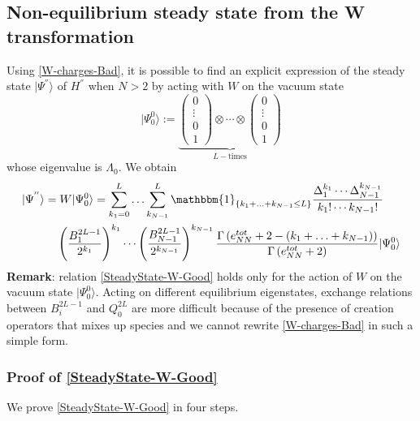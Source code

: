 \documentclass[10pt]{article}
\numberwithin{equation}{section}
\numberwithin{equation}{subsection}
\begin{document}
\subsection{Non-equilibrium steady state from the W transformation}\label{subsection-NONSS-W}
Using \eqref{W-charges-Bad}, it is possible to find an explicit expression of the steady state $|\Psi^{''}\rangle$ of $H^{''}$ when $N>2$ by acting with $W$ on the vacuum state 
\begin{equation}\label{Vacuum-state}
	|\Psi_{0}^{0}\rangle:=\underbrace{\begin{pmatrix}
			0\\
			\vdots\\
			0\\
			1
		\end{pmatrix}\otimes \cdots \otimes\begin{pmatrix}
			0\\
			\vdots\\
			0\\
			1
	\end{pmatrix}}_{L-\text{times}}
\end{equation} whose eigenvalue is $\Lambda_{0}$. 
We obtain 
\begin{equation}\label{SteadyState-W-Good}
	\begin{split}
		|\Psi^{''}\rangle=&	\;W|\Psi_{0}^{0}\rangle =\sum_{k_{1}=0}^{L}\ldots\sum_{k_{N-1}}^{L}\mathbbm{1}_{\{k_{1}+\ldots+k_{N-1}\leq L\}}\frac{\Delta_{1}^{k_{1}}\cdots \Delta_{N-1}^{k_{N-1}}}{k_{1}!\cdots k_{N-1}!}\\&
		\left(\frac{B_{1}^{2L-1}}{2^{k_{1}}}\right)^{k_{1}}\cdots\left( \frac{B_{N-1}^{2L-1}}{2^{k_{N-1}}}\right)^{k_{N-1}}\frac{\Gamma\left(e_{NN}^{tot}+2-(k_{1}+\ldots+k_{N-1})\right)}{\Gamma\left(e_{NN}^{tot}+2\right)}|\Psi_{0}^{0}\rangle
	\end{split}
\end{equation}
\textbf{Remark}: relation \eqref{SteadyState-W-Good} holds only for the action of $W$ on the vacuum state $|\Psi_{0}^{0}\rangle$. Acting on different equilibrium eigenstates, exchange relations between $B_{i}^{2L-1}$ and $Q_{0}^{2L}$ are more difficult because of the presence of creation operators that mixes up species and we cannot rewrite \eqref{W-charges-Bad} in such a simple form. 
\subsubsection{Proof of \eqref{SteadyState-W-Good}}
We prove \eqref{SteadyState-W-Good} in four steps. 
\end{document}
